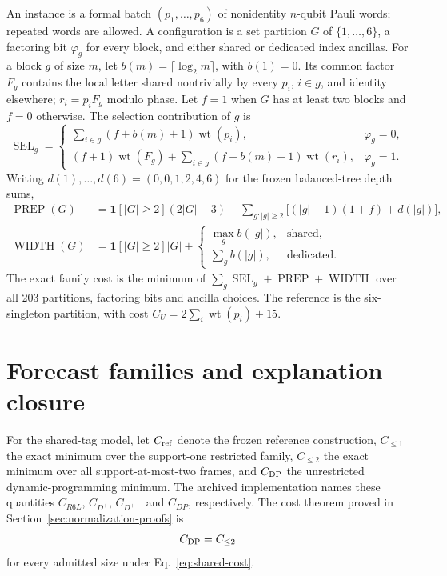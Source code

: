\documentclass[a4paper,onecolumn,11pt,unpublished,noarxiv]{quantumarticle}
\begin{document}
An instance is a formal batch $(p_1,\ldots,p_6)$ of nonidentity $n$-qubit Pauli words; repeated words are allowed.  A configuration is a set partition $G$ of $\{1,\ldots,6\}$, a factoring bit $\varphi_g$ for every block, and either shared or dedicated index ancillas.  For a block $g$ of size $m$, let $b(m)=\lceil\log_2m\rceil$, with $b(1)=0$.  Its common factor $F_g$ contains the local letter shared nontrivially by every $p_i$, $i\in g$, and identity elsewhere; $r_i=p_iF_g$ modulo phase.  Let $f=1$ when $G$ has at least two blocks and $f=0$ otherwise.  The selection contribution of $g$ is
\begin{equation}
\operatorname{SEL}_g=
\begin{cases}
\sum_{i\in g}(f+b(m)+1)\operatorname{wt}(p_i),&\varphi_g=0,\\
(f+1)\operatorname{wt}(F_g)+\sum_{i\in g}(f+b(m)+1)\operatorname{wt}(r_i),&\varphi_g=1.
\end{cases}
\end{equation}
Writing $d(1),\ldots,d(6)=(0,0,1,2,4,6)$ for the frozen balanced-tree depth sums,
\begin{align}
\operatorname{PREP}(G)&=\mathbf1[|G|\ge2](2|G|-3)+\sum_{g:|g|\ge2}\bigl[(|g|-1)(1+f)+d(|g|)\bigr],\\
\operatorname{WIDTH}(G)&=\mathbf1[|G|\ge2]|G|+
\begin{cases}
\max_g b(|g|),&\text{shared},\\
\sum_gb(|g|),&\text{dedicated}.
\end{cases}
\end{align}
The exact family cost is the minimum of $\sum_g\operatorname{SEL}_g+\operatorname{PREP}+\operatorname{WIDTH}$ over all 203 partitions, factoring bits and ancilla choices.  The reference is the six-singleton partition, with cost $C_U=2\sum_i\operatorname{wt}(p_i)+15$.

\section{Forecast families and explanation closure}\label{sec:forecast-families}

For the shared-tag model, let $C_{\rm ref}$ denote the frozen reference construction, $C_{\le1}$ the exact minimum over the support-one restricted family, $C_{\le2}$ the exact minimum over all support-at-most-two frames, and $C_{\rm DP}$ the unrestricted dynamic-programming minimum.  The archived implementation names these quantities $C_{R6L}$, $C_{D^+}$, $C_{D^{++}}$ and $C_{DP}$, respectively.  The cost theorem proved in Section~\ref{sec:normalization-proofs} is
\begin{equation}
C_{\rm DP}=C_{\le2}
\end{equation}
for every admitted size under Eq.~\eqref{eq:shared-cost}.
\end{document}
